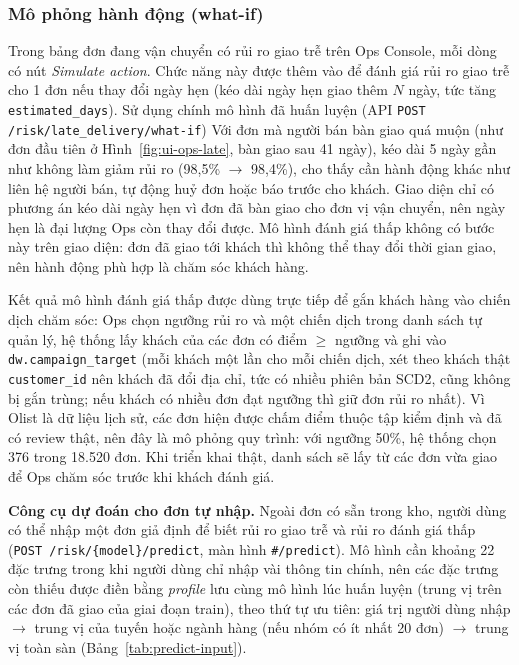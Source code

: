 \subsubsection{Mô phỏng hành động (what-if)}\label{sec:dss-whatif}
\hspace{1cm}
Trong bảng đơn đang vận chuyển có rủi ro giao trễ trên Ops Console, mỗi dòng có nút
\textit{Simulate action}.
Chức năng này được thêm vào để đánh giá rủi ro giao trễ cho 1 đơn nếu thay đổi ngày hẹn
(kéo dài ngày hẹn giao thêm $N$ ngày, tức tăng \texttt{estimated\_days}). Sử dụng chính mô hình đã huấn luyện
(API \texttt{POST /risk/late\_delivery/what-if})
Với đơn mà người bán bàn giao quá muộn (như đơn đầu tiên ở Hình~\ref{fig:ui-ops-late}, bàn giao sau 41 ngày), kéo dài 5 ngày gần
như không làm giảm rủi ro (98,5\% $\to$ 98,4\%), cho thấy cần hành động khác như liên hệ người bán, tự động huỷ đơn
hoặc báo trước cho khách. Giao diện chỉ có phương án kéo dài ngày hẹn vì đơn đã bàn giao cho đơn
vị vận chuyển, nên ngày hẹn là đại lượng Ops còn thay đổi được.
Mô hình đánh giá thấp không có bước này trên giao diện: đơn đã giao tới khách thì không thể thay
đổi thời gian giao, nên hành động phù hợp là chăm sóc khách hàng.

Kết quả mô hình đánh giá thấp được dùng trực tiếp để gắn khách hàng vào chiến dịch chăm sóc:
Ops chọn ngưỡng rủi ro và một chiến dịch trong danh sách tự quản lý, hệ thống lấy khách của các
đơn có điểm $\geq$ ngưỡng và ghi vào \texttt{dw.campaign\_target} (mỗi khách một lần cho mỗi
chiến dịch, xét theo khách thật \texttt{customer\_id} nên khách đã đổi địa chỉ, tức có nhiều phiên
bản SCD2, cũng không bị gắn trùng; nếu khách có nhiều đơn đạt ngưỡng thì giữ đơn rủi ro nhất). 
Vì Olist là dữ liệu lịch sử, các đơn hiện được chấm điểm thuộc tập kiểm định và đã
có review thật, nên đây là mô phỏng quy trình: với ngưỡng 50\%, hệ thống chọn 376 trong 18.520
đơn. Khi triển khai thật, danh sách sẽ lấy từ các đơn vừa giao để Ops chăm sóc trước khi khách
đánh giá.

\textbf{Công cụ dự đoán cho đơn tự nhập.} Ngoài đơn có sẵn trong kho, người dùng có thể nhập một
đơn giả định để biết rủi ro giao trễ và rủi ro đánh giá thấp
(\texttt{POST /risk/\{model\}/predict}, màn hình \texttt{\#/predict}). Mô hình cần khoảng 22
đặc trưng trong khi người dùng chỉ nhập vài thông tin chính, nên các đặc trưng còn thiếu được
điền bằng \textit{profile} lưu cùng mô hình lúc huấn luyện (trung vị trên các đơn đã giao của
giai đoạn train), theo thứ tự ưu tiên: giá trị người dùng nhập $\to$ trung vị của tuyến hoặc
ngành hàng (nếu nhóm có ít nhất 20 đơn) $\to$ trung vị toàn sàn (Bảng~\ref{tab:predict-input}).

